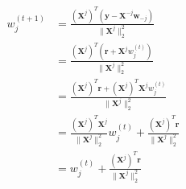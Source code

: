 \newcommand{\matrix}[1]{\mathbf{#1}}
\newcommand{\vector}[1]{\mathbf{#1}}
\newcommand{\X}{\matrix{X}}
\newcommand{\y}{\vector{y}}
\newcommand{\w}{\vector{w}}
\newcommand{\r}{\vector{r}}
\begin{align*}
w_j^{(t+1)} &= \frac{(\X^j)^T (\y - \X^{-j} \w_{-j} )}{\|\X^j\|_2^2} \\
&= \frac{(\X^j)^T (\r + \X^{j} w_{j}^{(t)} )}{\|\X^j\|_2^2} \\
&= \frac{(\X^j)^T \r + (\X^j)^T \X^{j} w_{j}^{(t)} }{\|\X^j\|_2^2} \\
&= \frac{(\X^j)^T \X^{j}}{\|\X^j\|_2^2}w_j^{(t)} + \frac{(\X^j)^T \r}{\|\X^j\|_2^2} \\
&= w_j^{(t)} + \frac{(\X^j)^T \r}{\|\X^j\|_2^2} \\
\end{align*}
